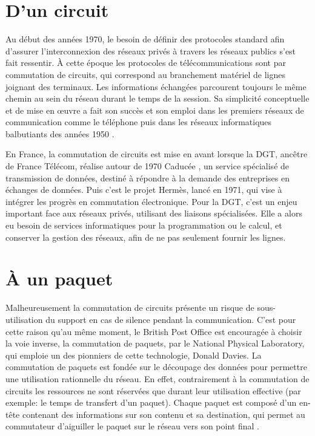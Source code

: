 \documentclass[12pt]{report}
\begin{document}
\section{D'un circuit}

Au début des années 1970, le besoin de définir des protocoles standard afin d'assurer l'interconnexion des réseaux privés à travers les réseaux publics s'est fait ressentir.
À cette époque les protocoles de télécommunications sont par commutation de circuits, qui correspond au branchement matériel de lignes joignant des terminaux. Les informations échangées parcourent toujours le même chemin au sein du réseau durant le temps de la session. Sa simplicité conceptuelle et de mise en œuvre a fait son succès et son emploi dans les premiers réseaux de communication comme le téléphone puis dans les réseaux informatiques balbutiants des années 1950 \cite{wikicc}.

En France, la commutation de circuits est mise en avant lorsque la \gls{DGT}, ancêtre de France Télécom, réalise autour de 1970 \og Caducée \fg, un service spécialisé de transmission de données, destiné à répondre à la demande des entreprises en échanges de données. Puis c'est le projet Hermès, lancé en 1971, qui vise à intégrer les progrès en commutation électronique. Pour la DGT, c'est un enjeu important face aux réseaux privés, utilisant des liaisons spécialisées. Elle a alors eu besoin de services informatiques pour la programmation ou le calcul, et conserver la gestion des réseaux, afin de ne pas seulement fournir les lignes.

\section{À un paquet}

Malheureusement la commutation de circuits présente un risque de sous-utilisation du support en cas de \og silence \fg pendant la communication.
C'est pour cette raison qu'au même moment, le British Post Office est encouragée à choisir la voie inverse, la commutation de paquets, par le National Physical Laboratory, qui emploie un des pionniers de cette technologie, Donald Davies. La commutation de paquets est fondée sur le découpage des données pour permettre une utilisation rationnelle du réseau. En effet, contrairement à la commutation de circuits les ressources ne sont réservées que durant leur utilisation effective (par exemple: le temps de transfert d'un paquet). Chaque paquet est composé d'un en-tête contenant des informations sur son contenu et sa destination, qui permet au commutateur d'aiguiller le paquet sur le réseau vers son point final \cite{wikicp}.
\end{document}

